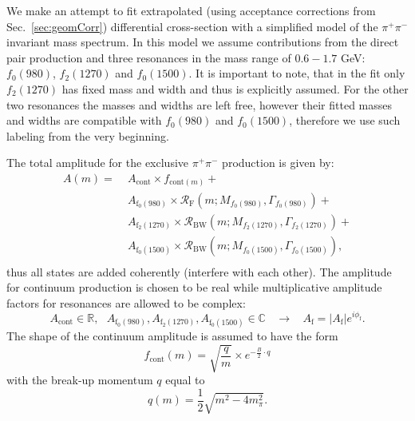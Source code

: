 We make an attempt to fit extrapolated (using acceptance corrections from Sec.~\ref{sec:geomCorr}) differential cross-section with a simplified model of the $\pi^{+}\pi^{-}$ invariant mass spectrum. In this model we assume contributions from the direct pair production and three resonances in the mass range of $0.6-1.7$ GeV: $f_0(980)$, $f_2(1270)$ and $f_0(1500)$. It is important to note, that in the fit only $f_{2}(1270)$ has fixed mass and width and thus is explicitly assumed. For the other two resonances the masses and widths are left free, however their fitted masses and widths are compatible with $f_0(980)$ and $f_0(1500)$, therefore we use such labeling from the very beginning.

The total amplitude for the exclusive $\pi^{+}\pi^{-}$ production is given by:
% 
\begin{equation}
\label{eq:amplitude}
\begin{aligned}
A(m) = & \;A_{\textrm{cont}}\times f_{\textrm{cont}(m)}+ \\
        & \;A_{\textrm{f}_0(980)} \times \mathcal{R}_{\textrm{F}}\left(m;M_{f_0(980)},\Gamma_{f_0(980)}\right)+ \\
        & \;A_{\textrm{f}_2(1270)} \times \mathcal{R}_{\textrm{BW}}\left(m;M_{f_2(1270)},\Gamma_{f_2(1270)}\right) +\\
        & \;A_{\textrm{f}_0(1500)} \times \mathcal{R}_{\textrm{BW}}\left(m;M_{f_0(1500)},\Gamma_{f_0(1500)}\right),\\
\end{aligned}
\end{equation}
%
thus all states are added coherently (interfere with each other). The amplitude for continuum production is chosen to be real while multiplicative amplitude factors for resonances are allowed to be complex:
\begin{equation}A_{\textrm{cont}}\in\mathbb{R},~~~A_{\textrm{f}_0(980)},A_{\textrm{f}_2(1270)},A_{\textrm{f}_0(1500)}\in\mathbb{C}~~~~\rightarrow~~~~A_{\textrm{f}}=|A_{\textrm{f}}|e^{i\phi_{\textrm{f}}}.\end{equation}
%
The shape of the continuum amplitude is assumed to have the form
\begin{equation}f_{\textrm{cont}}(m) = \sqrt{\frac{q}{m}}\times e^{-\frac{B}{2}\cdot q}\end{equation}
with the break-up momentum $q$ equal to
\begin{equation}\label{eq:breakupMom}
q(m) = \frac{1}{2}\sqrt{m^{2}-4m_{\pi}^{2}}.
\end{equation}
